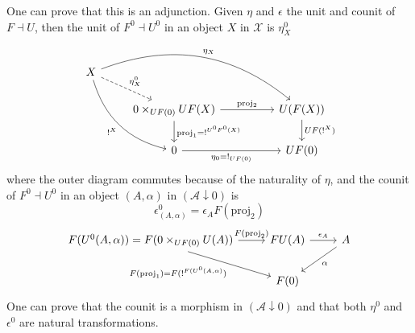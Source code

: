 One can prove that this is an adjunction. Given $\eta$ and $\epsilon$ the unit and counit of $F \dashv U$, then the unit of $F^0 \dashv U^0$ in an object $X$ in $\mathcal{X}$ is $\eta^0_X$
\begin{equation}\label{unit of adjunction in 0}
\begin{tikzcd}
X \arrow[rrrd, "\eta_X", bend left] \arrow[rdd, "!^X"', bend right] \arrow[rd, "\eta^0_X", dashed] &                                                                                  &  &                              \\
                                                                                                   & 0\times_{UF(0)}UF(X) \arrow[rr, "\mathrm{proj_2}"] \arrow[d, "\mathrm{proj}_1=!^{U^0F^0(X)}"] &  & U(F(X)) \arrow[d, "UF(!^X)"] \\
                                                                                                   & 0 \arrow[rr, "\eta_0=!_{UF(0)}"']                                                &  & UF(0)                       
\end{tikzcd}
\end{equation}
where the outer diagram commutes because of the naturality of $\eta$, and the counit of $F^0 \dashv U^0$ in an object $(A,\alpha)$ in $(\mathcal{A} \downarrow 0)$ is
\[
\epsilon^0_{(A,\alpha)} = \epsilon_{A} F(\mathrm{proj}_2)
\]
\[
\begin{tikzcd}
{F(U^0(A,\alpha))=F(0\times_{UF(0)}U(A))} \arrow[r, "F(\mathrm{proj}_2)"] \arrow[rd, "{F(\mathrm{proj}_1)=F(!^{F(U^0(A,\alpha)})}"'] & FU(A) \arrow[r, "\epsilon_A"] & A \arrow[ld, "\alpha"] \\
                                                                                                                                     & F(0)                          &                       
\end{tikzcd}
\]
One can prove that the counit is a morphism in $(\mathcal{A} \downarrow 0)$ and that both $\eta^0$ and $\epsilon^0$ are natural transformations.

